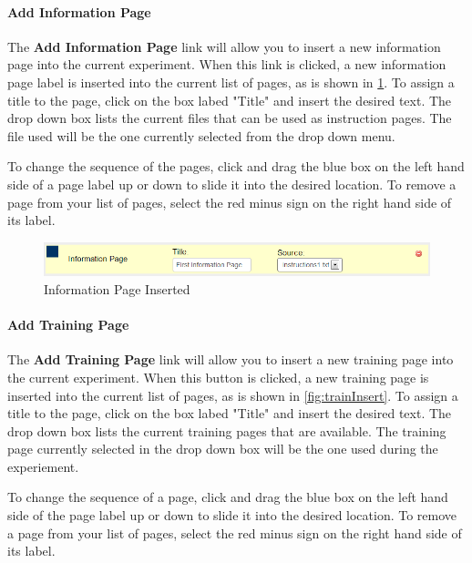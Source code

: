 \documentclass[article]{ij4uq}              %
\begin{document}
\paragraph{Add Information Page}

The \textbf{Add Information Page} link will allow you to insert a new information page into the current experiment. When this link is clicked, a new information page label is inserted into the current list of pages, as is shown in \ref{fig:infoInsert}.  To assign a title to the page, click on the box labed "Title" and insert the desired text.  The drop down box lists the current files that can be used as instruction pages.  The file used will be the one currently selected from the drop down menu.

To change the sequence of the pages, click and drag the blue box on the left hand side of a page label up or down to slide it into the desired location. To remove a page from your list of pages, select the red minus sign on the right hand side of its label.

\begin{figure}[htb]
 \centering
 \includegraphics[width=5.0in]{figures/add_instruction.png}
 \caption{Information Page Inserted}
 \label{fig:infoInsert}
\end{figure}
\FloatBarrier

\paragraph{Add Training Page}

The \textbf{Add Training Page} link will allow you to insert a new training page into the current experiment. When this button is clicked, a new training page is inserted into the current list of pages, as is shown in \ref{fig:trainInsert}.  To assign a title to the page, click on the box labed "Title" and insert the desired text.  The drop down box lists the current training pages that are available.  The training page currently selected in the drop down box will be the one used during the experiement.

To change the sequence of a page, click and drag the blue box on the left hand side of the page label up or down to slide it into the desired location. To remove a page from your list of pages, select the red minus sign on the right hand side of its label.
\end{document}
